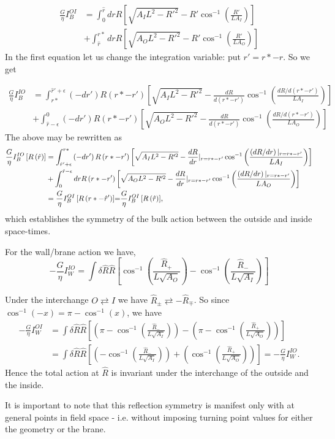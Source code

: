 \documentclass[a4paper,11pt]{article}
\numberwithin{equation}{section}
\numberwithin{equation}{section}
\begin{document}
\begin{align}
\frac{G}{\eta}I_{B}^{OI} & =\int_{0}^{\hat{r}}drR\left[\sqrt{A_{I}L^{2}-R'^{2}}-R'\cos^{-1}\left(\frac{R'}{LA_{I}}\right)\right]\nonumber \\
 & +\int_{\hat{r}}^{r*}drR\left[\sqrt{A_{O}L^{2}-R'^{2}}-R'\cos^{-1}\left(\frac{R'}{LA_{O}}\right)\right]\label{eq:OI}
\end{align}
In the first equation let us change the integration variable: put
$r'=r*-r$. So we get 

\begin{align}
\frac{G}{\eta}I_{B}^{IO} & =\int_{r*}^{\hat{r}'+\epsilon}\left(-dr'\right)R\left(r*-r'\right)\left[\sqrt{A_{I}L^{2}-R'^{2}}-\frac{dR}{d\left(r*-r'\right)}\cos^{-1}\left(\frac{dR/d\left(r*-r'\right)}{LA_{I}}\right)\right]\nonumber \\
 & +\int_{\hat{r}-\epsilon}^{0}\left(-dr'\right)R\left(r*-r'\right)\left[\sqrt{A_{O}L^{2}-R'^{2}}-\frac{dR}{d\left(r*-r'\right)}\cos^{-1}\left(\frac{dR/d\left(r*-r'\right)}{LA_{O}}\right)\right]\label{eq:IO-1}
\end{align}
The above may be rewritten as
\begin{align*}
\frac{G}{\eta}I_{B}^{IO}\left[R\left(\hat{r}\right)\right] & =\int_{\hat{r}'+\epsilon}^{r*}\left(-dr'\right)R\left(r*-r'\right)\left[\sqrt{A_{I}L^{2}-R'^{2}}-\frac{dR}{dr}\vert_{r=r*-r'}\cos^{-1}\left(\frac{\left(dR/dr\right)\vert_{r=r*-r'}}{LA_{I}}\right)\right]\\
 & +\int_{0}^{\hat{r}-\epsilon}drR\left(r*-r'\right)\left[\sqrt{A_{O}L^{2}-R'^{2}}-\frac{dR}{dr}\vert_{r=r*-r'}\cos^{-1}\left(\frac{\left(dR/dr\right)\vert_{r=r*-r'}}{LA_{O}}\right)\right]\\
 & =\text{\ensuremath{\frac{G}{\eta}I_{B}^{OI}\left[R\left(r*-\hat{r}'\right)\right]}=\ensuremath{\frac{G}{\eta}I_{B}^{OI}\left[R\left(\hat{r}\right)\right]}},
\end{align*}
which establishes the symmetry of the bulk action between the outside
and inside space-times.

For the wall/brane action we have, 
\begin{equation}
-\frac{G}{\eta}I_{W}^{IO}=\int\delta\hat{R}\hat{R}\left[\cos^{-1}\left(\frac{\hat{R}_{+}}{L\sqrt{A_{O}}}\right)-\cos^{-1}\left(\frac{\hat{R}_{-}}{L\sqrt{A_{I}}}\right)\right]\label{eq:WIO}
\end{equation}

Under the interchange $O\rightleftarrows I$ we have $\hat{R}_{\pm}\rightleftarrows-\hat{R}_{\mp}$.
So since $\cos^{-1}\left(-x\right)=\pi-\cos^{-1}\left(x\right)$,
we have 
\begin{align*}
-\frac{G}{\eta}I_{W}^{OI} & =\int\delta\hat{R}\hat{R}\left[\left(\pi-\cos^{-1}\left(\frac{\hat{R}_{-}}{L\sqrt{A_{I}}}\right)\right)-\left(\pi-\cos^{-1}\left(\frac{\hat{R}_{+}}{L\sqrt{A_{O}}}\right)\right)\right]\\
 & =\int\delta\hat{R}\hat{R}\left[\left(-\cos^{-1}\left(\frac{\hat{R}_{-}}{L\sqrt{A_{I}}}\right)\right)+\left(\cos^{-1}\left(\frac{\hat{R}_{+}}{L\sqrt{A_{O}}}\right)\right)\right]=-\frac{G}{\eta}I_{W}^{IO}.
\end{align*}
Hence the total action at $\hat{R}$ is invariant under the interchange
of the outside and the inside.

It is important to note that this reflection symmetry is manifest only with at general points in field space - i.e. without imposing turning point values for either the geometry or
the brane.






\end{document}
